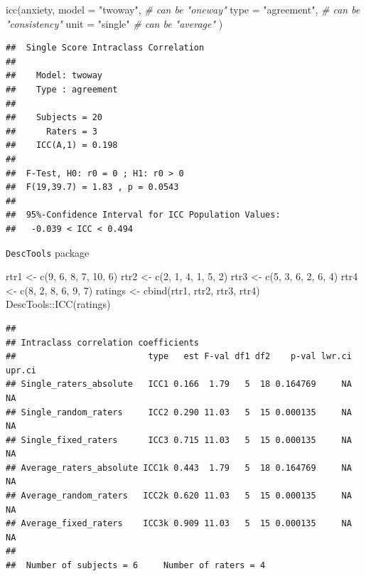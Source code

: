 \documentclass[
]{book}
\newenvironment{Shaded}{\begin{snugshade}}{\end{snugshade}}
\newcommand{\AttributeTok}[1]{\textcolor[rgb]{0.77,0.63,0.00}{#1}}
\newcommand{\CommentTok}[1]{\textcolor[rgb]{0.56,0.35,0.01}{\textit{#1}}}
\newcommand{\DecValTok}[1]{\textcolor[rgb]{0.00,0.00,0.81}{#1}}
\newcommand{\FunctionTok}[1]{\textcolor[rgb]{0.00,0.00,0.00}{#1}}
\newcommand{\NormalTok}[1]{#1}
\newcommand{\OtherTok}[1]{\textcolor[rgb]{0.56,0.35,0.01}{#1}}
\newcommand{\SpecialCharTok}[1]{\textcolor[rgb]{0.00,0.00,0.00}{#1}}
\newcommand{\StringTok}[1]{\textcolor[rgb]{0.31,0.60,0.02}{#1}}
\begin{document}
\begin{Shaded}
\begin{Highlighting}[]
\FunctionTok{icc}\NormalTok{(anxiety,}
    \AttributeTok{model =} \StringTok{"twoway"}\NormalTok{, }\CommentTok{\# can be "oneway"}
    \AttributeTok{type =} \StringTok{"agreement"}\NormalTok{, }\CommentTok{\# can be "consistency"}
    \AttributeTok{unit =} \StringTok{"single"} \CommentTok{\# can be "average"}
\NormalTok{    )}
\end{Highlighting}
\end{Shaded}

\begin{verbatim}
##  Single Score Intraclass Correlation
## 
##    Model: twoway 
##    Type : agreement 
## 
##    Subjects = 20 
##      Raters = 3 
##    ICC(A,1) = 0.198
## 
##  F-Test, H0: r0 = 0 ; H1: r0 > 0 
##  F(19,39.7) = 1.83 , p = 0.0543 
## 
##  95%-Confidence Interval for ICC Population Values:
##   -0.039 < ICC < 0.494
\end{verbatim}

\texttt{DescTools} package

\begin{Shaded}
\begin{Highlighting}[]
\NormalTok{rtr1 }\OtherTok{\textless{}{-}} \FunctionTok{c}\NormalTok{(}\DecValTok{9}\NormalTok{, }\DecValTok{6}\NormalTok{, }\DecValTok{8}\NormalTok{, }\DecValTok{7}\NormalTok{, }\DecValTok{10}\NormalTok{, }\DecValTok{6}\NormalTok{)}
\NormalTok{rtr2 }\OtherTok{\textless{}{-}} \FunctionTok{c}\NormalTok{(}\DecValTok{2}\NormalTok{, }\DecValTok{1}\NormalTok{, }\DecValTok{4}\NormalTok{, }\DecValTok{1}\NormalTok{,  }\DecValTok{5}\NormalTok{, }\DecValTok{2}\NormalTok{)}
\NormalTok{rtr3 }\OtherTok{\textless{}{-}} \FunctionTok{c}\NormalTok{(}\DecValTok{5}\NormalTok{, }\DecValTok{3}\NormalTok{, }\DecValTok{6}\NormalTok{, }\DecValTok{2}\NormalTok{,  }\DecValTok{6}\NormalTok{, }\DecValTok{4}\NormalTok{)}
\NormalTok{rtr4 }\OtherTok{\textless{}{-}} \FunctionTok{c}\NormalTok{(}\DecValTok{8}\NormalTok{, }\DecValTok{2}\NormalTok{, }\DecValTok{8}\NormalTok{, }\DecValTok{6}\NormalTok{,  }\DecValTok{9}\NormalTok{, }\DecValTok{7}\NormalTok{)}
\NormalTok{ratings }\OtherTok{\textless{}{-}} \FunctionTok{cbind}\NormalTok{(rtr1, rtr2, rtr3, rtr4)}
\NormalTok{DescTools}\SpecialCharTok{::}\FunctionTok{ICC}\NormalTok{(ratings)}
\end{Highlighting}
\end{Shaded}

\begin{verbatim}
## 
## Intraclass correlation coefficients 
##                          type   est F-val df1 df2    p-val lwr.ci upr.ci
## Single_raters_absolute   ICC1 0.166  1.79   5  18 0.164769     NA     NA
## Single_random_raters     ICC2 0.290 11.03   5  15 0.000135     NA     NA
## Single_fixed_raters      ICC3 0.715 11.03   5  15 0.000135     NA     NA
## Average_raters_absolute ICC1k 0.443  1.79   5  18 0.164769     NA     NA
## Average_random_raters   ICC2k 0.620 11.03   5  15 0.000135     NA     NA
## Average_fixed_raters    ICC3k 0.909 11.03   5  15 0.000135     NA     NA
## 
##  Number of subjects = 6     Number of raters = 4
\end{verbatim}
\end{document}
